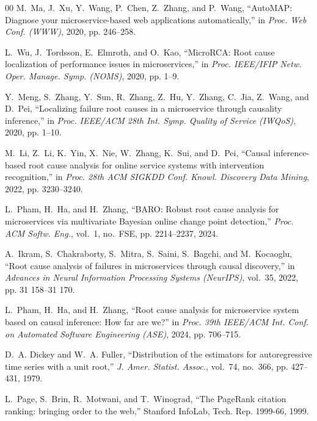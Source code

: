 \documentclass[conference,a4paper]{IEEEtran}
\begin{document}
\begin{thebibliography}{00}
M.~Ma, J.~Xu, Y.~Wang, P.~Chen, Z.~Zhang, and P.~Wang, ``AutoMAP: Diagnose
your microservice-based web applications automatically,'' in \emph{Proc. Web
Conf. (WWW)}, 2020, pp. 246--258.

L.~Wu, J.~Tordsson, E.~Elmroth, and O.~Kao, ``MicroRCA: Root cause
localization of performance issues in microservices,'' in \emph{Proc.
IEEE/IFIP Netw. Oper. Manage. Symp. (NOMS)}, 2020, pp. 1--9.

Y.~Meng, S.~Zhang, Y.~Sun, R.~Zhang, Z.~Hu, Y.~Zhang, C.~Jia, Z.~Wang, and
D.~Pei, ``Localizing failure root causes in a microservice through causality
inference,'' in \emph{Proc. IEEE/ACM 28th Int. Symp. Quality of Service
(IWQoS)}, 2020, pp. 1--10.

M.~Li, Z.~Li, K.~Yin, X.~Nie, W.~Zhang, K.~Sui, and D.~Pei, ``Causal
inference-based root cause analysis for online service systems with
intervention recognition,'' in \emph{Proc. 28th ACM SIGKDD Conf. Knowl.
Discovery Data Mining}, 2022, pp. 3230--3240.

L.~Pham, H.~Ha, and H.~Zhang, ``BARO: Robust root cause analysis for
microservices via multivariate Bayesian online change point detection,''
\emph{Proc. ACM Softw. Eng.}, vol.~1, no.~FSE, pp. 2214--2237, 2024.

A.~Ikram, S.~Chakraborty, S.~Mitra, S.~Saini, S.~Bagchi, and M.~Kocaoglu,
``Root cause analysis of failures in microservices through causal
discovery,'' in \emph{Advances in Neural Information Processing Systems
(NeurIPS)}, vol.~35, 2022, pp. 31 158--31 170.

L.~Pham, H.~Ha, and H.~Zhang, ``Root cause analysis for microservice system
based on causal inference: How far are we?'' in \emph{Proc. 39th IEEE/ACM
Int. Conf. on Automated Software Engineering (ASE)}, 2024, pp. 706--715.

D.~A. Dickey and W.~A. Fuller, ``Distribution of the estimators for
autoregressive time series with a unit root,'' \emph{J. Amer. Statist. Assoc.},
vol.~74, no.~366, pp. 427--431, 1979.

L.~Page, S.~Brin, R.~Motwani, and T.~Winograd, ``The PageRank citation ranking:
bringing order to the web,'' Stanford InfoLab, Tech. Rep. 1999-66, 1999.

\end{thebibliography}
\end{document}
